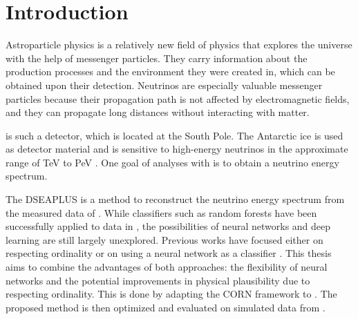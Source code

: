 \chapter{Introduction}
Astroparticle physics is a relatively new field of physics
  that explores the universe
    with the help of messenger particles.
They carry information about
    the production processes
    and the environment they were created in,
  which can be obtained upon their detection.
Neutrinos are especially valuable messenger particles
  because their propagation path is not affected by electromagnetic fields,
  and they can propagate long distances without interacting with matter.


\icecube{} is such a detector,
  which is located at the South Pole.
The Antarctic ice is used as detector material
  and is sensitive to high-energy neutrinos
    in the approximate range of \si{\tera\electronvolt} to \si{\peta\electronvolt} \cite{icecube_aartsen}.
%
One goal of analyses with \icecube{} is
  to obtain a neutrino energy spectrum.

The \acf{DSEAPLUS} \cite{dsea_unification}
is a method to reconstruct the neutrino energy spectrum
  from the measured data of \icecube{}.
While classifiers such as random forests
have been successfully applied to \icecube{} data in \dsea{} \cite{hymon2021seasonal},
the possibilities of neural networks and deep learning are still largely unexplored. %
%
Previous works
have focused either
  on respecting ordinality \cite{dsea_jan} %
  or on using a neural network as a classifier \cite{dsea_samuel}.
This thesis aims to combine the advantages of both approaches:
  the flexibility of neural networks
  and the potential improvements in physical plausibility
    due to respecting ordinality.
This is done by adapting the
\acf{CORN} framework \cite{corn}
to \dsea{}.
The proposed method is then optimized and evaluated
  on simulated data from \icecube{}.

